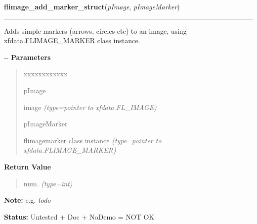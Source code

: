 \hspace{.8\funcindent}\begin{boxedminipage}{\funcwidth}

    \raggedright \textbf{flimage\_add\_marker\_struct}(\textit{pImage}, \textit{pImageMarker})

    \vspace{-1.5ex}

    \rule{\textwidth}{0.5\fboxrule}
\setlength{\parskip}{2ex}

Adds simple markers (arrows, circles etc) to an image, using
xfdata.FLIMAGE\_MARKER class instance.

-{}-
\setlength{\parskip}{1ex}
      \textbf{Parameters}
      \vspace{-1ex}

      \begin{quote}
        \begin{Ventry}{xxxxxxxxxxxx}

          \item[pImage]


image
            {\it (type=pointer to xfdata.FL\_IMAGE)}

          \item[pImageMarker]


flimagemarker class instance
            {\it (type=pointer to xfdata.FLIMAGE\_MARKER)}

        \end{Ventry}

      \end{quote}

      \textbf{Return Value}
    \vspace{-1ex}

      \begin{quote}

num.
      {\it (type=int)}

      \end{quote}

\textbf{Note:} 
e.g. \emph{todo}


\textbf{Status:} 
Untested + Doc + NoDemo = NOT OK


    \end{boxedminipage}

    \label{xformslib:flflimage:flimage_define_marker}

    \vspace{0.5ex}

